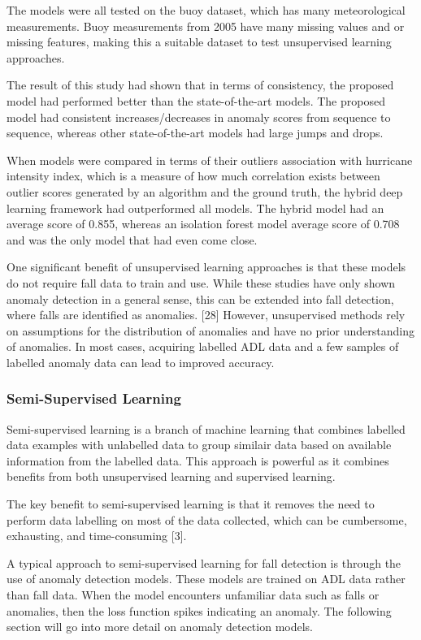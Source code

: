 The models were all tested on the buoy dataset, which has many meteorological measurements. Buoy measurements from 2005 have many missing values and or missing features, making this a suitable dataset to test unsupervised learning approaches. 

The result of this study had shown that in terms of consistency, the proposed model had performed better than the state-of-the-art models. The proposed model had consistent increases/decreases in anomaly scores from sequence to sequence, whereas other state-of-the-art models had large jumps and drops. 

When models were compared in terms of their outliers association with hurricane intensity index, which is a measure of how much correlation exists between outlier scores generated by an algorithm and the ground truth, the hybrid deep learning framework had outperformed all models. The hybrid model had an average score of 0.855, whereas an isolation forest model average score of 0.708 and was the only model that had even come close. 

One significant benefit of unsupervised learning approaches is that these models do not require fall data to train and use. While these studies have only shown anomaly detection in a general sense, this can be extended into fall detection, where falls are identified as anomalies. [28] However, unsupervised methods rely on assumptions for the distribution of anomalies and have no prior understanding of anomalies. In most cases, acquiring labelled ADL data and a few samples of labelled anomaly data can lead to improved accuracy.

\subsubsection{Semi-Supervised Learning}
Semi-supervised learning is a branch of machine learning that combines labelled data examples with unlabelled data to group similair data based on available information from the labelled data. This approach is powerful as it combines benefits from both unsupervised learning and supervised learning. 

The key benefit to semi-supervised learning is that it removes the need to perform data labelling on most of the data collected, which can be cumbersome, exhausting, and time-consuming [3]. 

A typical approach to semi-supervised learning for fall detection is through the use of anomaly detection models. These models are trained on ADL data rather than fall data. When the model encounters unfamiliar data such as falls or anomalies, then the loss function spikes indicating an anomaly. The following section will go into more detail on anomaly detection models.

